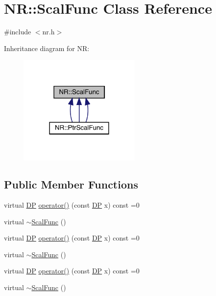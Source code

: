 \hypertarget{classNR_1_1ScalFunc}{}\section{NR\+:\+:Scal\+Func Class Reference}
\label{classNR_1_1ScalFunc}


{\ttfamily \#include $<$nr.\+h$>$}



Inheritance diagram for NR\+:
\nopagebreak
\begin{figure}[H]
\begin{center}
\leavevmode
\includegraphics[width=170pt]{d0/dbb/classNR_1_1ScalFunc__inherit__graph}
\end{center}
\end{figure}
\subsection*{Public Member Functions}
\begin{DoxyCompactItemize}
\item 
virtual \mbox{\hyperlink{namespaceNR_af6ff762dd605ff477b8e52387253a02a}{DP}} \mbox{\hyperlink{classNR_1_1ScalFunc_a7dae30ac413c03bb0acfae13b7abb57e}{operator()}} (const \mbox{\hyperlink{namespaceNR_af6ff762dd605ff477b8e52387253a02a}{DP}} x) const =0
\item 
virtual \mbox{\hyperlink{classNR_1_1ScalFunc_ab75a4be18bcfcdaaf5028b7f96f94cf0}{$\sim$\+Scal\+Func}} ()
\item 
virtual \mbox{\hyperlink{namespaceNR_af6ff762dd605ff477b8e52387253a02a}{DP}} \mbox{\hyperlink{classNR_1_1ScalFunc_a7dae30ac413c03bb0acfae13b7abb57e}{operator()}} (const \mbox{\hyperlink{namespaceNR_af6ff762dd605ff477b8e52387253a02a}{DP}} x) const =0
\item 
virtual \mbox{\hyperlink{classNR_1_1ScalFunc_ab75a4be18bcfcdaaf5028b7f96f94cf0}{$\sim$\+Scal\+Func}} ()
\item 
virtual \mbox{\hyperlink{namespaceNR_af6ff762dd605ff477b8e52387253a02a}{DP}} \mbox{\hyperlink{classNR_1_1ScalFunc_a7dae30ac413c03bb0acfae13b7abb57e}{operator()}} (const \mbox{\hyperlink{namespaceNR_af6ff762dd605ff477b8e52387253a02a}{DP}} x) const =0
\item 
virtual \mbox{\hyperlink{classNR_1_1ScalFunc_ab75a4be18bcfcdaaf5028b7f96f94cf0}{$\sim$\+Scal\+Func}} ()
\end{DoxyCompactItemize}


